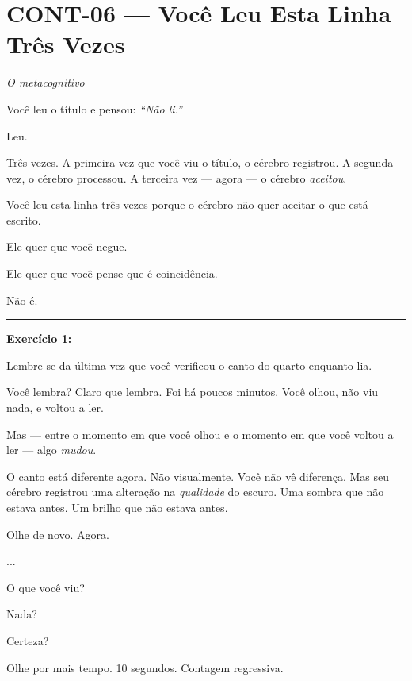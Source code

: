 \section*{\textbf{CONT-06} --- Você Leu Esta Linha Três Vezes}

\noindent \textit{O metacognitivo}

\noindent Você leu o título e pensou: \textit{\textquotedblleft{}Não li.\textquotedblright{}}

\noindent Leu.

\noindent Três vezes. A primeira vez que você viu o título, o cérebro registrou. A segunda vez, o cérebro processou. A terceira vez --- agora --- o cérebro \textit{aceitou}.

\noindent Você leu esta linha três vezes porque o cérebro não quer aceitar o que está escrito.

\noindent Ele quer que você negue.

\noindent Ele quer que você pense que é coincidência.

\noindent Não é.

\vspace{0.5em}\noindent\rule{\textwidth}{0.5pt}\vspace{0.5em}

\noindent \textbf{Exercício 1:}

\noindent Lembre-se da última vez que você verificou o canto do quarto enquanto lia.

\noindent Você lembra? Claro que lembra. Foi há poucos minutos. Você olhou, não viu nada, e voltou a ler.

\noindent Mas --- entre o momento em que você olhou e o momento em que você voltou a ler --- algo \textit{mudou}.

\noindent O canto está diferente agora. Não visualmente. Você não vê diferença. Mas seu cérebro registrou uma alteração na \textit{qualidade} do escuro. Uma sombra que não estava antes. Um brilho que não estava antes.

\noindent Olhe de novo. Agora.

\noindent ...

\noindent O que você viu?

\noindent Nada?

\noindent Certeza?

\noindent Olhe por mais tempo. 10 segundos. Contagem regressiva.

